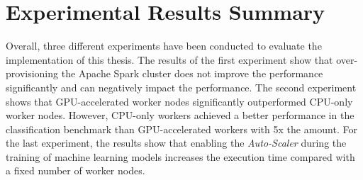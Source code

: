 \section{Experimental Results Summary}
Overall, three different experiments have been conducted to evaluate the implementation of this thesis.
The results of the first experiment show that over-provisioning the Apache Spark cluster does not improve the performance significantly and can negatively impact the performance. 
The second experiment shows that GPU-accelerated worker nodes significantly outperformed CPU-only worker nodes. However, CPU-only workers achieved a better performance in the classification benchmark than GPU-accelerated workers with 5x the amount.
For the last experiment, the results show that enabling the \textit{Auto-Scaler} during the training of machine learning models increases the execution time compared with a fixed number of worker nodes.
